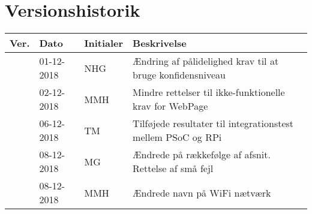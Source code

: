 \documentclass[Kravspecifikation/Kravspec_Main.tex]{subfiles}
\begin{document}
\section{Versionshistorik}
\begin{longtable}{|L{0.07\textwidth}|L{0.15\textwidth}|L{0.13\textwidth}|L{0.55\textwidth}|}
        \hline
        \textbf{Ver.} & \textbf{Dato} & \textbf{Initialer} & \textbf{Beskrivelse}  \\ \hline
         & 01-12-2018 & NHG & Ændring af pålidelighed krav til at bruge konfidensniveau \\ \hline
         & 02-12-2018 & MMH & Mindre rettelser til ikke-funktionelle krav for WebPage \\ \hline
         & 06-12-2018 & TM & Tilføjede resultater til integrationstest mellem PSoC og RPi \\ \hline
         & 08-12-2018 & MG & Ændrede på rækkefølge af afsnit. Rettelse af små fejl  \\ \hline
         & 08-12-2018 & MMH & Ændrede navn på WiFi nætværk \\ \hline
\end{longtable}
\end{document}
